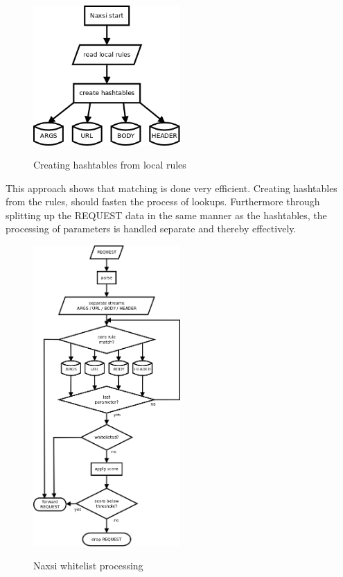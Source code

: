 \documentclass[Naxsi]{subfiles}
\begin{document}
\begin{figure}[h]
\caption{Creating hashtables from local rules}
\centering
\includegraphics[width=0.5\textwidth] {images/hashtables.png}
\label{fig:hashtables}
\end{figure}

This approach shows that matching is done very efficient. Creating hashtables from the rules, should fasten the process of lookups. Furthermore through splitting up the REQUEST data in the same manner as the hashtables, the processing of parameters is handled separate and thereby effectively.

\begin{figure}[h]
\caption{Naxsi whitelist processing}
\centering
\includegraphics[width=0.5\textwidth] {images/whitelist_processing.png}
\label{fig:whitelist_processing}
\end{figure}
\end{document}

